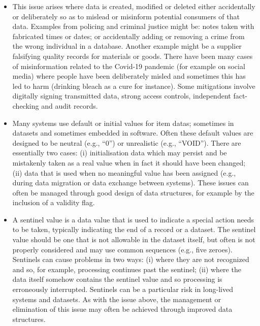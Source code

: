 \begin{itemize}
  \item {} This issue arises where data is created, modified or deleted either accidentally or deliberately so as to mislead or misinform potential consumers of that data. Examples from policing and criminal justice might be: notes taken with fabricated times or dates; or accidentally adding or removing a crime from the wrong individual in a \gls{database}. Another example might be a supplier falsifying quality records for materials or goods. There have been many cases of misinformation related to the Covid-19 pandemic (for example on social media) where people have been deliberately misled and sometimes this has led to harm (drinking bleach as a cure for instance). Some mitigations involve digitally signing transmitted data, strong access controls, independent fact-checking and audit records.

  \item {} Many systems use default or initial values for \glspl{item data}; sometimes in \glspl{dataset} and sometimes embedded in software. Often these default values are designed to be neutral (e.g., ``0'') or unrealistic (e.g., ``VOID''). There are essentially two cases: (i) initialisation data which may persist and be mistakenly taken as a real value when in fact it should have been changed; (ii) data that is used when no meaningful value has been assigned (e.g., during data migration or data exchange between systems). These issues can often be managed through good design of data structures, for example by the inclusion of a validity flag.

  \item {} A sentinel value is a data value that is used to indicate a special action needs to be taken, typically indicating the end of a record or a \gls{dataset}. The sentinel value should be one that is not allowable in the \gls{dataset} itself, but often is not properly considered and may use common sequences (e.g., five zeroes). Sentinels can cause problems in two ways: (i) where they are not recognized and so, for example, processing continues past the sentinel; (ii) where the data itself somehow contains the sentinel value and so processing is erroneously interrupted. Sentinels can be a particular risk in long-lived systems and \glspl{dataset}. As with the issue above, the management or elimination of this issue may often be achieved through improved data structures.


\end{itemize}
